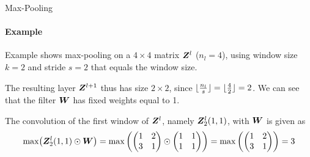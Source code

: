 \begin{frame}{Max-Pooling}
\framesubtitle{Example}
Example shows max-pooling on a $4 \times 4$ matrix
    ${\boldsymbol Z}^l$ ($n_l=4$), using window size $k=2$ and stride $s=2$ that
    equals the window size. 

	\medskip

	The resulting layer ${\boldsymbol Z}^{l+1}$ thus has
    size $2 \times 2$, since $\lfloor\tfrac{n_l}{s}\rfloor = \lfloor\tfrac{4}{2}\rfloor = 2$. 
    We can see that the filter ${\boldsymbol W}$ has fixed weights equal to 1. 

	\medskip

     The convolution of the 
    first window of ${\boldsymbol Z}^l$, namely ${\boldsymbol Z}^l_2(1,1)$, with ${\boldsymbol W}$
    is given as %
    \begin{align*}
        \max\bigl({\boldsymbol Z}^l_2(1,1) \odot {\boldsymbol W}\bigr) = 
        \max\left(
            \begin{pmatrix} 1 & 2\\3 & 1 \end{pmatrix} \odot \begin{pmatrix} 1 & 1\\1 & 1 \end{pmatrix}
        \right) = 
        \max\left( \begin{pmatrix} 1 & 2\\3& 1 \end{pmatrix}\right)  = 3
    \end{align*}
\end{frame}
